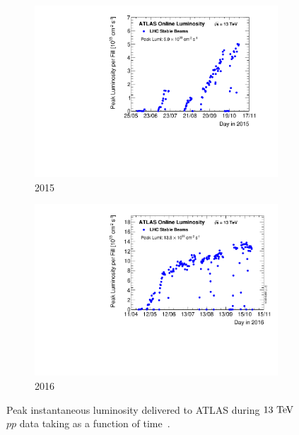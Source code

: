 \begin{figure}[tbp]
  \centering
  \begin{subfigure}[b]{.48\textwidth}
    \includegraphics[width=\textwidth]{figs/detector/peakLumiByFill2015}
    \caption{2015}
  \end{subfigure}
  \begin{subfigure}[b]{.48\textwidth}
    \includegraphics[width=\textwidth]{figs/detector/peakLumiByFill2016}
    \caption{2016}
  \end{subfigure}
  \caption[Peak instantaneous luminosity delivered to ATLAS during $13\tev$ $pp$ data taking as a function of time.]{Peak instantaneous luminosity delivered to ATLAS during $13\tev$ $pp$ data taking as a function of time~\cite{2019.atlas-lumi-plots}.}
  \label{fig:detector_instantaneous_lumi}
\end{figure}


